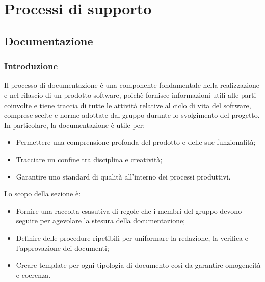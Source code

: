 \section{Processi di supporto}

\subsection{Documentazione}
\subsubsection{Introduzione}
Il processo di documentazione è una componente fondamentale nella realizzazione e nel rilascio di un prodotto software,
poichè fornisce informazioni utili alle parti coinvolte e tiene traccia di tutte le attività relative al ciclo di vita del software,
comprese scelte e norme adottate dal gruppo durante lo svolgimento del progetto. In particolare, la documentazione è utile per:
\begin{itemize}
	\item Permettere una comprensione profonda del prodotto e delle sue funzionalità;
	\item Tracciare un confine tra disciplina e creatività;
	\item Garantire uno standard di qualità all'interno dei processi produttivi.
\end{itemize}
Lo scopo della sezione è:
\begin{itemize}
	\item Fornire una raccolta esasutiva di regole che i membri del gruppo devono seguire per agevolare la stesura della documentazione;
	\item Definire delle procedure ripetibili per uniformare la redazione, la verifica e l'approvazione dei documenti;
	\item Creare template per ogni tipologia di documento così da garantire omogeneità e coerenza.
\end{itemize}

